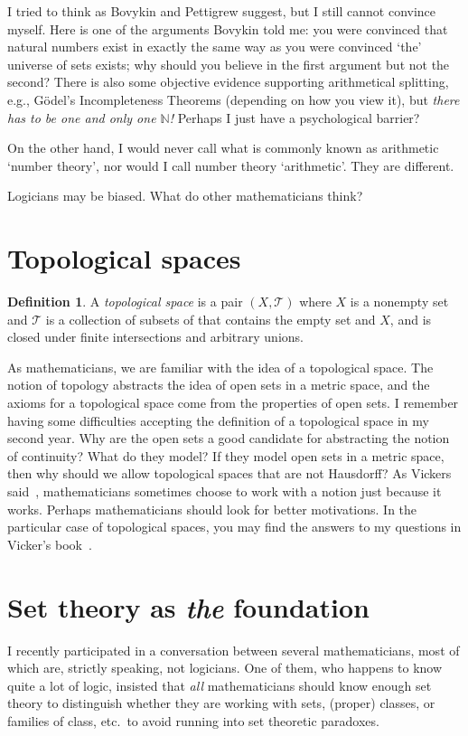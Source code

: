 \documentclass{bhamthesis}
\theoremstyle{definition}
\newtheorem*{defn}{Definition}
\newcommand{\mar}[1]{\marginpar{\raggedright#1}}
\newcommand{\IN}{\mathbb{N}}
\begin{document}
I tried to think as Bovykin and Pettigrew suggest, but I still
cannot convince myself.  Here is one of the arguments Bovykin told
me: you were convinced that natural numbers exist in exactly the
same way as you were convinced `the' universe of sets exists; why
should you believe in the first argument but not the second? There
is also some objective evidence supporting arithmetical splitting,
e.g., G\"odel's Incompleteness Theorems (depending on how you view
it), but \emph{there has to be one and only one $\IN$!}  Perhaps I
just have a psychological barrier?

On the other hand, I would never call what is commonly known as
arithmetic `number theory', nor would I call number theory
`arithmetic'.  They are different.

Logicians may be biased.  What do other mathematicians think?

\section{Topological spaces}
\begin{defn}
 A \emph{topological space} is a pair $(X,\mathcal{T})$ where $X$
 is a nonempty set and $\mathcal{T}$ is a collection of subsets of
 that contains the empty set and $X$, and is closed under finite
 intersections and arbitrary unions.
\end{defn}
As mathematicians, we are familiar with the idea of a topological
space.  The notion of topology abstracts the idea of open sets in
a metric space, and the axioms for a topological space come from
the properties of open sets.  I remember having some difficulties
accepting the definition of a topological space in my second year.
Why are the open sets a good candidate for abstracting the notion
of continuity?  What do they model?  If they model open sets in a
metric space, then why should we allow topological spaces that are
not Hausdorff?  As Vickers said~\cite{unpub:vickers/dptsem},
mathematicians sometimes choose to work with a notion just because
it works.  Perhaps mathematicians should look for better
motivations.  In the particular case of topological spaces, you
may find the answers to my questions in Vicker's
book~\cite{book:topologic}.\mar{This is another awkward looking
widow.}

\section{Set theory as \emph{the} foundation}
I recently participated in a conversation between several
mathematicians, most of which are, strictly speaking, not
logicians.  One of them, who happens to know quite a lot of logic,
insisted that \emph{all} mathematicians should know enough set
theory to distinguish whether they are working with sets, (proper)
classes, or families of class, etc.\ to avoid running into set
theoretic paradoxes.
\end{document}
